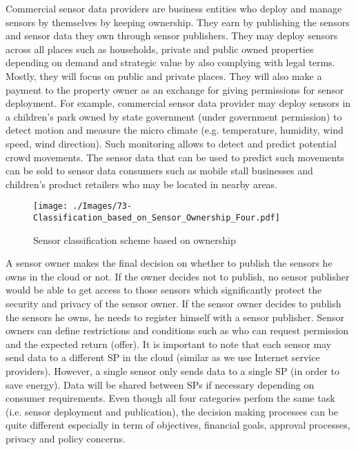 \documentclass[times]{ettauth}
\newenvironment{noindlist}
 {\begin{list}{\labelitemi}{\leftmargin=1.2em \itemindent=-.5em}}
 {\end{list}}
\begin{document}
\begin{noindlist}
\item Commercial sensor data providers are business entities who deploy and manage sensors by themselves by keeping ownership. They earn by publishing the sensors and sensor data they own through sensor publishers. They may deploy sensors across all places such as households, private and public owned properties depending on demand and strategic value by also complying with legal terms. Mostly, they will focus on public and private places. They will also make a payment to the property owner as an exchange for giving permissions for sensor deployment. For example, commercial sensor data provider may deploy sensors in a children's park owned by state government (under government permission) to detect motion and measure the micro climate (e.g. temperature, humidity, wind speed, wind direction). Such monitoring allows to detect and predict potential crowd movements. The sensor data that can be used to predict such movements can be sold to sensor data consumers such as mobile stall businesses and children's product retailers who may be located in nearby areas.


\end{noindlist}


\begin{figure}[t]
 \centering
\texttt{[image: ./Images/73-Classification\_based\_on\_Sensor\_Ownership\_Four.pdf]}
\caption{Sensor classification scheme based on ownership}
\label{Figure:Classification_based_on_Sensor_Ownership}	
\vspace{-0.12cm}	
\end{figure}



A sensor owner makes the final decision on whether to publish the sensors he owns in the cloud or not. If the owner decides not to publish, no sensor publisher would be able to get access to those sensors which significantly protect the security and privacy of the sensor owner. If the sensor owner decides to publish the sensors he owns, he needs to register himself with a sensor publisher. Sensor owners can define restrictions and conditions such as who can request permission and the expected return (offer). It is important to note that each sensor may send data to a different SP in the cloud (similar as we use Internet service providers). However, a single sensor only sends data to a single SP (in order to save energy). Data will be shared between SPs if necessary depending on consumer requirements. Even though all four categories perfom the same task (i.e. sensor deployment and publication), the decision making processes can be quite different especially in term of objectives, financial goals, approval processes, privacy and policy concerns.
\end{document}
